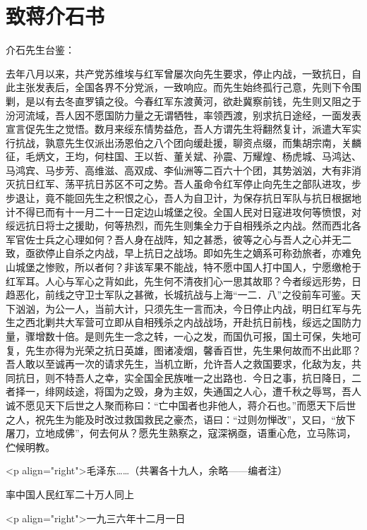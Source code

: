 \section[致蒋介石书（一九三六年十二月一日）]{致蒋介石书}


介石先生台鉴：

去年八月以来，共产党苏维埃与红军曾屡次向先生要求，停止内战，一致抗日，自此主张发表后，全国各界不分党派，一致响应。而先生始终孤行己意，先则下令围剿，是以有去冬直罗镇之役。今春红军东渡黄河，欲赴冀察前钱，先生则又阻之于汾河流域，吾人因不愿国防力量之无谓牺牲，率领西渡，别求抗日途经，一面发表宣言促先生之觉悟。数月来绥东情势益危，吾人方谓先生将翻然复计，派遣大军实行抗战，孰意先生仅派出汤恩伯之八个团向缓赴援，聊资点缀，而集胡宗南，关麟征，毛炳文，王均，何柱国、王以哲、董关斌、孙震、万耀煌、杨虎城、马鸿达、马鸿宾、马步芳、高维滋、高双成、李仙洲等二百六十个团，其势汹汹，大有非消灭抗日红军、荡平抗日苏区不可之势。吾人虽命令红军停止向先生之部队进攻，步步退让，竟不能回先生之积恨之心，吾人为自卫计，为保存抗日军队与抗日根据地计不得已而有十一月二十一日定边山城堡之役。全国人民对日寇进攻何等愤恨，对绥远抗日将士之援助，何等热烈，而先生则集全力于自相残杀之内战。然而西北各军官佐士兵之心理如何？吾人身在战阵，知之甚悉，彼等之心与吾人之心并无二致，亟欲停止自杀之内战，早上抗日之战场。即如先生之嫡系可称劲旅者，亦难免山城堡之惨败，所以者何？非该军果不能战，特不愿中国人打中国人，宁愿缴枪于红军耳。人心与军心之背如此，先生何不清夜扪心一思其故耶？今者绥远形势，日趋恶化，前线之守卫士军队之甚微，长城抗战与上海“一二．八”之役前车可鉴。天下汹汹，为公一人，当前大计，只须先生一言而决，今日停止内战，明日红军与先生之西北剿共大军营可立即从自相残杀之内战战场，开赴抗日前栈，绥远之国防力量，骤增数十倍。是则先生一念之转，一心之发，而国仇可报，国土可保，失地可复，先生亦得为光荣之抗日英雄，图诸凌烟，馨香百世，先生果何故而不出此耶？吾人敢以至诚再一次的请求先生，当机立断，允许吾人之救国要求，化敌为友，共同抗日，则不特吾人之幸，实全国全民族唯一之出路也．今日之事，抗日降日，二者择一，绯网歧途，将国为之毁，身为主奴，失通国之人心，遭千秋之辱骂，吾人诚不愿见天下后世之人聚而称曰：“亡中国者也非他人，蒋介石也。”而愿天下后世之人，祝先生为能及时改过救国救民之豪杰，语曰：“过则勿惮改”，又曰，“放下屠刀，立地成佛”，何去何从？愿先生熟察之，寇深祸亟，语重心危，立马陈词，伫候明教。

<p align="right">毛泽东……（共署各十九人，余略——编者注）

 率中国人民红军二十万人同上

<p align="right">一九三六年十二月一日




